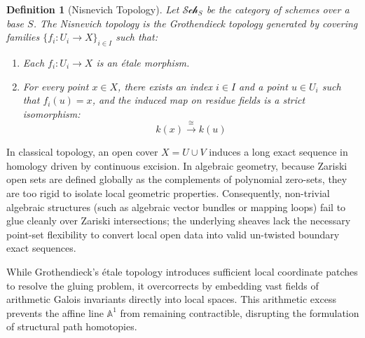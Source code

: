 \documentclass[11pt,oneside]{article}
\newtheorem{definition}{Definition}[section]
\begin{document}
\begin{definition}[Nisnevich Topology]
Let $\mathcal{Sch}_S$ be the category of schemes over a base $S$. The \emph{Nisnevich topology} is the Grothendieck topology generated by covering families $\{f_i: U_i \to X\}_{i \in I}$ such that:
\begin{enumerate}
    \item Each $f_i: U_i \to X$ is an \'etale morphism.
    \item For every point $x \in X$, there exists an index $i \in I$ and a point $u \in U_i$ such that $f_i(u) = x$, and the induced map on residue fields is a strict isomorphism:
    \[ k(x) \xrightarrow{\cong} k(u) \]
\end{enumerate}
\end{definition}

In classical topology, an open cover $X = U \cup V$ induces a long exact sequence in homology driven by continuous excision. In algebraic geometry, because Zariski open sets are defined globally as the complements of polynomial zero-sets, they are too rigid to isolate local geometric properties. Consequently, non-trivial algebraic structures (such as algebraic vector bundles or mapping loops) fail to glue cleanly over Zariski intersections; the underlying sheaves lack the necessary point-set flexibility to convert local open data into valid un-twisted boundary exact sequences.

While Grothendieck's \'etale topology introduces sufficient local coordinate patches to resolve the gluing problem, it overcorrects by embedding vast fields of arithmetic Galois invariants directly into local spaces. This arithmetic excess prevents the affine line $\mathbb{A}^1$ from remaining contractible, disrupting the formulation of structural path homotopies.
\end{document}

